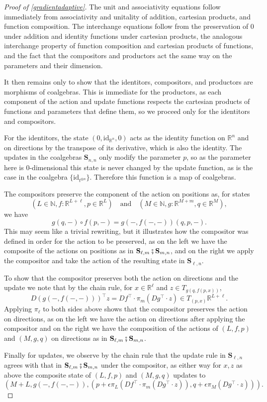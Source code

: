 \documentclass{eptcs}
\theoremstyle{definition}
\theoremstyle{plain}
\newcommand{\Cat}[1]{\textbf{#1}}%
\newcommand{\id}{\mathrm{id}}
\newcommand{\then}{\mathbin{\fatsemi}}
\newcommand{\nn}{\mathbb{N}}
\newcommand{\rr}{\mathbb{R}}
\newcommand{\0}{\textsf{0}}
\newcommand{\1}{\tn{\textsf{1}}}
\renewcommand{\S}{{\Cat{S}}}
\newcommand{\idcoalg}[1]{{\{\id_{#1}\}}}
\begin{document}
\begin{proof}[Proof of \cref{gradientadaptive}]
The unit and associativity equations follow immediately from associativity and unitality of addition, cartesian products, and function composition. The interchange equations follow from the preservation of 0 under addition and identity functions under cartesian products, the analogous interchange property of function composition and cartesian products of functions, and the fact that the compositors and productors act the same way on the parameters and their dimension. 

It then remains only to show that the identitors, compositors, and productors are morphisms of coalgebras. This is immediate for the productors, as each component of the action and update functions respects the cartesian products of functions and parameters that define them, so we proceed only for the identitors and compositors.

For the identitors, the state $(0,\id_{\rr^n},0)$ acts as the identity function on $\rr^n$ and on directions by the transpose of its derivative, which is also the identity. The updates in the coalgebras $\S_{n,n}$ only modify the parameter $p$, so as the parameter here is 0-dimensional this state is never changed by the update function, as is the case in the coalgebra $\idcoalg{t^{\otimes n}}$. Therefore this function is a map of coalgebras.

The compositors preserve the component of the action on positions as, for states 
\[(L \in \nn, f\colon \rr^{L+\ell}, p \in \rr^L) \quad \textrm{and} \quad (M \in \nn, g\colon \rr^{M+m}, q \in \rr^M),\]
we have 
\[g(q,-) \circ f(p,-) = g(-,f(-,-))(q,p,-).\]
This may seem like a trivial rewriting, but it illustrates how the compositor was defined in order for the action to be preserved, as on the left we have the composite of the actions on positions as in $\S_{\ell,m}\then\S_{m,n}$, and on the right we apply the compositor and take the action of the resulting state in $\S_{\ell,n}$.

To show that the compositor preserves both the action on directions and the update we note that by the chain rule, for $x \in \rr^\ell$ and $z \in T_{g(q,f(p,x))}$,
\[D\left( g(-,f(-,-)) \right)^\top z = Df^\top \cdot \pi_m(Dg^\top \cdot z) \in T_{(p,x)}\rr^{L+\ell}.\]
Applying $\pi_\ell$ to both sides above shows that the compositor preserves the action on directions, as on the left we have the action on directions after applying the compositor and on the right we have the composition of the actions of $(L,f,p)$ and $(M,g,q)$ on directions as in $\S_{\ell,m}\then\S_{m,n}$.

Finally for updates, we observe by the chain rule that the update rule in $\S_{\ell,n}$ agrees with that in $\S_{\ell,m}\then\S_{m,n}$ under the compositor, as either way for $x,z$ as above the composite state of $(L,f,p)$ and $(M,g,q)$ updates to 
\[\left( M+L,g(-,f(-,-)),\left( p + \epsilon \pi_L (Df^\top \cdot \pi_m(Dg^\top \cdot z)),q + \epsilon \pi_M(Dg^\top \cdot z) \right) \right).\]
\end{proof}




\printbibliography 
\end{document}
